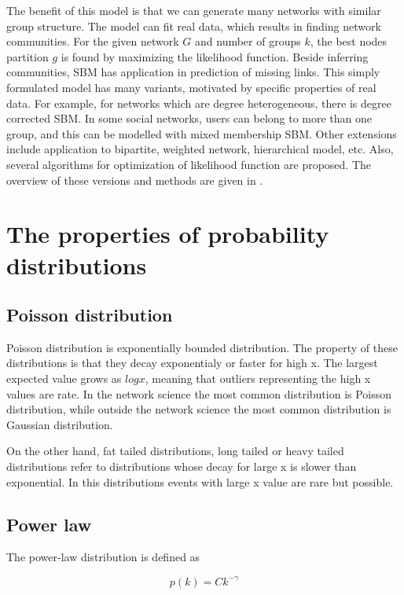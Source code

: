 The benefit of this model is that we can generate many networks with similar group structure. The model can fit real data, which results in finding network communities. For the given network $G$ and number of groups $k$, the best nodes partition $g$ is found by maximizing the likelihood function. Beside inferring communities, SBM has application in prediction of missing links. This simply formulated model has many variants, motivated by specific properties of real data. For example, for networks which are degree heterogeneous, there is degree corrected SBM. In some social networks, users can belong to more than one group, and this can be modelled with mixed membership SBM. Other extensions include application to bipartite, weighted network, hierarchical model, etc. Also, several algorithms for optimization of likelihood function are proposed. The overview of these versions and methods are given in \cite{comparison}. 


\newpage
\section{The properties of probability distributions}

\subsection{Poisson distribution}

Poisson distribution is exponentially bounded distribution. The property of these distributions is that they decay exponentialy or faster for high x. The largest expected value grows as $logx$, meaning that outliers representing the high x values are rate. In the network science the most common distribution is Poisson distribution, while outside the network science the most common distribution is Gaussian distribution. 

On the other hand, fat tailed distributions, long tailed or heavy tailed distributions refer to distributions whose decay for large x is slower than exponential. In this distributions events with large x value are rare but possible. 

\subsection{Power law}

The power-law distribution is defined as 

\begin{equation}
p(k) = C k^{-\gamma}
\end{equation}


